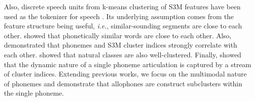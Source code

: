 Also, discrete speech units from k-means clustering of S3M features have been used as the tokenizer for speech \citep{chang2024exploring}.
Its underlying assumption comes from the feature structure being useful, \textit{i.e.}, similar-sounding segments are close to each other.
\citet{choi2024self} showed that phonetically similar words are close to each other.
Also, \citet{baevski2020wav2vec,hsu2021hubert,liu23j_interspeech} demonstrated that phonemes and S3M cluster indices strongly correlate with each other.
\citet{sicherman2023analysing,abdullah2023information} showed that natural classes are also well-clustered.
Finally, \citet{wells22_interspeech} showed that the dynamic nature of a single phoneme articulation is captured by a stream of cluster indices.
Extending previous works, we focus on the multimodal nature of phonemes and demonstrate that allophones are construct subclusters within the single phoneme.


